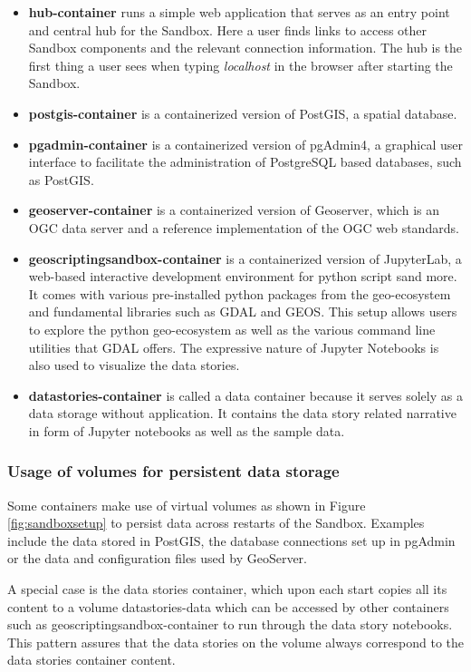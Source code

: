 \documentclass[11pt, a4paper, oneside, parskip=full-]{scrartcl}
\begin{document}
\begin{itemize}
  \item \textbf{hub-container} runs a simple web application that serves as an
  entry point and central hub for the Sandbox. Here a user finds links to access
  other Sandbox components and the relevant connection information. The hub is
  the first thing a user sees when typing \emph{localhost} in the browser after
  starting the Sandbox.
  \item \textbf{postgis-container} is a containerized version of PostGIS, a
  spatial database.
  \item \textbf{pgadmin-container} is a containerized version of pgAdmin4, a
  graphical user interface to facilitate the administration of PostgreSQL based
  databases, such as PostGIS.
  \item \textbf{geoserver-container} is a containerized version of Geoserver,
  which is an OGC data server and a reference implementation of the OGC web
  standards.
  \item \textbf{geoscriptingsandbox-container} is a containerized version of
  JupyterLab, a web-based interactive development environment for python script
  sand more. It comes with various pre-installed python packages from the
  geo-ecosystem and fundamental libraries such as GDAL and GEOS\cite{geos}. This
  setup allows users to explore the python geo-ecosystem as well as the various
  command line utilities that GDAL offers. The expressive nature of Jupyter
  Notebooks is also used to visualize the data stories.
  \item \textbf{datastories-container} is called a data container because it
  serves solely as a data storage without application. It contains the data
  story related narrative in form of Jupyter notebooks as well as the sample
  data.
\end{itemize}

\subsubsection*{Usage of volumes for persistent data storage}
Some containers make use of virtual volumes as shown in Figure
\ref{fig:sandboxsetup} to persist data across restarts of the Sandbox. Examples
include the data stored in PostGIS, the database connections set up in pgAdmin
or the data and configuration files used by GeoServer.

A special case is the data stories container, which upon each start copies all
its content to a volume datastories-data which can be accessed by other
containers such as geoscriptingsandbox-container to run through the data story
notebooks. This pattern assures that the data stories on the volume always
correspond to the data stories container content.
\end{document}
